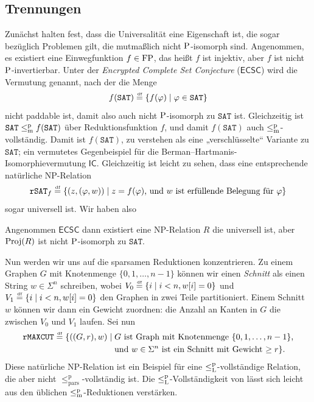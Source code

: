 \subsection*{Trennungen}

Zunächst halten \textcite{agrawal_universal_1992} fest, dass die Universalität eine Eigenschaft ist, die sogar bezüglich Problemen gilt, die mutmaßlich nicht $\P$-isomorph sind.
Angenommen, es existiert eine Einwegfunktion $f\in\FP$, das heißt $f$ ist injektiv, aber $f$ ist nicht $\P$-invertierbar.
Unter der \emph{Encrypted Complete Set Conjecture} ($\mathsf{ECSC}$) wird die Vermutung genannt, nach der die Menge
\[ f(\mathtt{SAT}) \defeq \{ f(\phi) \mid \phi\in\mathtt{SAT} \} \]
nicht paddable ist, damit also auch nicht $\P$-isomorph zu $\mathtt{SAT}$ ist.
Gleichzeitig ist $\mathtt{SAT}\leqmp f(\mathtt{SAT})$ über Reduktionsfunktion $f$, und damit $f(\mathtt{SAT})$ auch $\leqmp$-vollständig.
Damit ist $f(\mathtt{SAT})$, zu verstehen als eine „verschlüsselte“ Variante zu $\mathtt{SAT}$; ein vermutetes Gegenbeispiel für die Berman--Hartmanis-Isomorphievermutung $\mathsf{IC}$.
Gleichzeitig ist leicht zu sehen, dass eine entsprechende natürliche NP-Relation
\[ \mathtt{rSAT}_f \defeq \{ (z, (\phi, w)) \mid \text{$z=f(\phi)$, und $w$ ist erfüllende Belegung für $\phi$} \} \]
sogar universell ist.
Wir haben also %
\begin{observation}
    Angenommen $\mathsf{ECSC}$ dann existiert eine NP-Relation $R$ die universell ist, aber $\Proj(R)$ ist nicht $\P$-isomorph zu $\mathtt{SAT}$.
\end{observation}


Nun werden wir uns auf die sparsamen Reduktionen konzentrieren.
Zu einem Graphen $G$ mit Knotenmenge $\{0,1,\dots, n-1\}$ können wir einen \emph{Schnitt} als einen String $w\in\Sigma^n$ schreiben, wobei $V_0 \defeq \{ i \mid i<n, w[i]=0\}$ und $V_1 \defeq \{ i \mid i<n, w[i]=0\}$ den Graphen in zwei Teile partitioniert. Einem Schnitt $w$ können wir dann ein Gewicht zuordnen: die Anzahl an Kanten in $G$ die zwischen $V_0$ und $V_1$ laufen.
Sei nun
\[ \begin{split} \mathtt{rMAXCUT} \defeq \{ ((G, r), w) \mid {}&\text{$G$ ist Graph mit Knotenmenge $\{0,1,\dots,n-1\}$,} \\ &\text{und $w\in\Sigma^n$ ist ein Schnitt mit Gewicht $\geq r$} \}.\end{split} \]
Diese natürliche NP-Relation ist ein Beispiel für eine $\leqlp$-vollständige Relation, die aber nicht $\leq_\mathrm{pars}^\mathrm p$-vollständig ist. Die $\leqlp$-Vollständigkeit von lässt sich leicht aus den üblichen $\leqmp$-Reduktionen verstärken.

